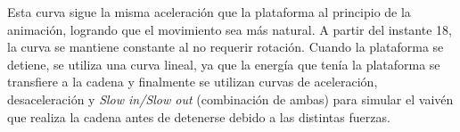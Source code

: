 \documentclass{article}
\begin{document}
Esta curva sigue la misma aceleración que la plataforma al principio de la animación, logrando que el movimiento sea más natural. A partir del instante 18, la curva se mantiene constante al no requerir rotación. Cuando la plataforma se detiene, se utiliza una curva lineal, ya que la energía que tenía la plataforma se transfiere a la cadena y finalmente se utilizan curvas de aceleración, desaceleración y \textit{Slow in/Slow out} (combinación de ambas) para simular el vaivén que realiza la cadena antes de detenerse debido a las distintas fuerzas.
\end{document}
